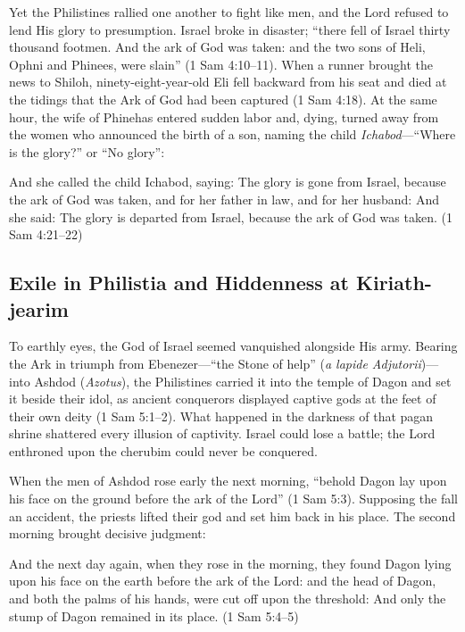 Yet the Philistines rallied one another to fight like men, and the Lord refused to lend His glory to presumption. Israel broke in disaster; ``there fell of Israel thirty thousand footmen. And the ark of God was taken: and the two sons of Heli, Ophni and Phinees, were slain'' (1 Sam 4:10--11). When a runner brought the news to Shiloh, ninety-eight-year-old Eli fell backward from his seat and died at the tidings that the Ark of God had been captured (1 Sam 4:18). At the same hour, the wife of Phinehas entered sudden labor and, dying, turned away from the women who announced the birth of a son, naming the child \textit{Ichabod}---``Where is the glory?'' or ``No glory'':

\begin{scriptureblock}
And she called the child Ichabod, saying: The glory is gone from Israel, because the ark of God was taken, and for her father in law, and for her husband: And she said: The glory is departed from Israel, because the ark of God was taken. \textnormal{(1 Sam 4:21--22)}
\end{scriptureblock}

\subsection{Exile in Philistia and Hiddenness at Kiriath-jearim}

To earthly eyes, the God of Israel seemed vanquished alongside His army. Bearing the Ark in triumph from Ebenezer---``the Stone of help'' (\textit{a lapide Adjutorii})---into Ashdod (\textit{Azotus}), the Philistines carried it into the temple of Dagon and set it beside their idol, as ancient conquerors displayed captive gods at the feet of their own deity (1 Sam 5:1--2). What happened in the darkness of that pagan shrine shattered every illusion of captivity. Israel could lose a battle; the Lord enthroned upon the cherubim could never be conquered.

When the men of Ashdod rose early the next morning, ``behold Dagon lay upon his face on the ground before the ark of the Lord'' (1 Sam 5:3). Supposing the fall an accident, the priests lifted their god and set him back in his place. The second morning brought decisive judgment:

\begin{scriptureblock}
And the next day again, when they rose in the morning, they found Dagon lying upon his face on the earth before the ark of the Lord: and the head of Dagon, and both the palms of his hands, were cut off upon the threshold: And only the stump of Dagon remained in its place. \textnormal{(1 Sam 5:4--5)}
\end{scriptureblock}

